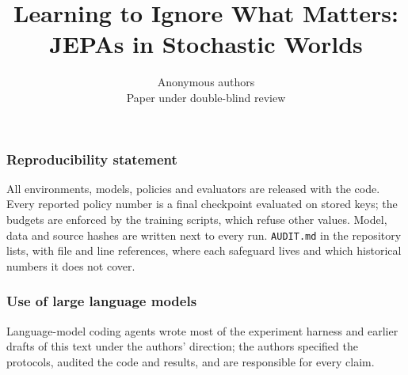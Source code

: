 \documentclass{article}
\title{Learning to Ignore What Matters:\\JEPAs in Stochastic Worlds}
\author{Anonymous authors\\Paper under double-blind review}
\theoremstyle{remark}
\begin{document}
\maketitle
{}
\begin{abstract}

\end{abstract}










\subsubsection*{Reproducibility statement}
All environments, models, policies and evaluators are released with the code. Every reported
policy number is a final checkpoint evaluated on stored keys; the budgets are enforced by the
training scripts, which refuse other values. Model, data and source hashes are written next to
every run. \texttt{AUDIT.md} in the repository lists, with file and line references, where each
safeguard lives and which historical numbers it does not cover.

\subsubsection*{Use of large language models}
Language-model coding agents wrote most of the experiment harness and earlier drafts of this
text under the authors' direction; the authors specified the protocols, audited the code and
results, and are responsible for every claim.




\appendix










\end{document}
